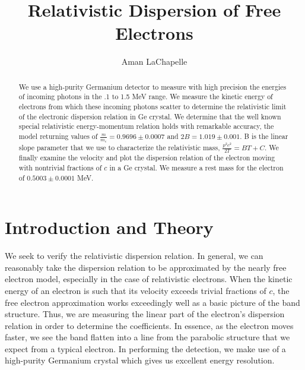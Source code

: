 \documentclass[reprint, nobibnotes, amssymb, amsmath, amsfonts, physics, mathtools, mathrsfs, floatfix]{revtex4-1}
\begin{document}
  \title{Relativistic Dispersion of Free Electrons}

  \author{Aman LaChapelle}


  \begin{abstract}
    We use a high-purity Germanium detector to measure with high precision the energies of incoming photons in the .1 to 1.5 MeV range.  We measure the kinetic energy of electrons from which these incoming photons scatter to determine the relativistic limit of the electronic dispersion relation in Ge crystal.  We determine that the well known special relativistic energy-momentum relation holds with remarkable accuracy, the model returning values of $\frac{m}{m_e} = 0.9696 \pm 0.0007$ and $2B = 1.019 \pm 0.001$.  B is the linear slope parameter that we use to characterize the relativistic mass, $\frac{p^2c^2}{2T} = BT + C$.  We finally examine the velocity and plot the dispersion relation of the electron moving with nontrivial fractions of $c$ in a Ge crystal.  We measure a rest mass for the electron of $0.5003\pm0.0001$ MeV.
  \end{abstract}

  \maketitle
  \tableofcontents

  \section{Introduction and Theory}
    We seek to verify the relativistic dispersion relation.  In general, we can reasonably take the dispersion relation to be approximated by the nearly free electron model, especially in the case of relativistic electrons.  When the kinetic energy of an electron is such that its velocity exceeds trivial fractions of $c$, the free electron approximation works exceedingly well as a basic picture of the band structure.  Thus, we are measuring the linear part of the electron's dispersion relation in order to determine the coefficients.  In essence, as the electron moves faster, we see the band flatten into a line from the parabolic structure that we expect from a typical electron.  In performing the detection, we make use of a high-purity Germanium crystal which gives us excellent energy resolution.

    \hspace{.25cm}
\end{document}
